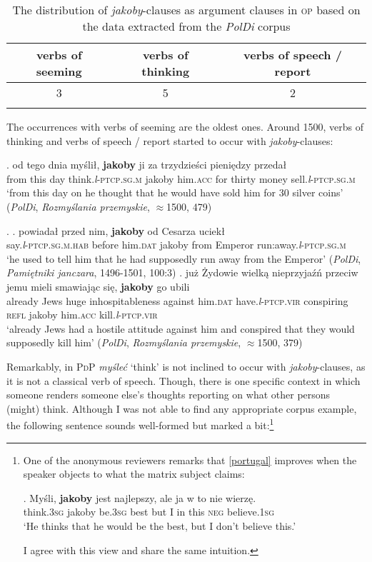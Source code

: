 \documentclass[output=paper
,modfonts
,nonflat]{langsci/langscibook}
\newcommand{\glossformat}[1]{\textsc{#1}}
\newcommand{\firstperson}{\glossformat{1}\xspace}
\newcommand{\thirdperson}{\glossformat{3}\xspace}
\newcommand{\acc}{\glossformat{acc}\xspace}
\newcommand{\dat}{\glossformat{dat}\xspace}
\newcommand{\hab}{\glossformat{hab}\xspace}
\newcommand{\negation}{\glossformat{neg}\xspace}
\newcommand{\lptcp}{\emph{l}\glossformat{-ptcp}\xspace}
\newcommand{\masc}{\glossformat{m}\xspace}
\newcommand{\refl}{\glossformat{refl}\xspace}
\newcommand{\sg}{\glossformat{sg}\xspace}
\newcommand{\vir}{\glossformat{vir}\xspace}
\newcommand{\nquelle}[1]{\newline\phantom{x}\hfill(#1)}
\begin{document}
 \begin{table}[h] \center \begin{tabular}{ccc} 
 \lsptoprule
verbs of seeming & verbs of thinking & verbs of speech / report \\
\midrule
3 & 5 & 2  \\
 \lspbottomrule
\end{tabular}
\caption{The distribution of \emph{jakoby}-clauses as argument clauses in \textsc{op} based on the data extracted from the \emph{PolDi} corpus} \label{staropolski_statystka_argument}
\end{table}

\noindent The occurrences with verbs of seeming are the oldest ones. Around 1500, verbs of thinking and verbs of speech / report started to occur with \emph{jakoby}-clauses:

\exg.		od tego dnia myślił, \textbf{jakoby} ji za trzydzieści pieniędzy przedał \\
		from this day think.{\lptcp}.{\sg}.{\masc} jakoby him.{\acc} for thirty money sell.{\lptcp}.{\sg}.{\masc} \\
		`from this day on he thought that he would have sold him for 30 silver coins' \nquelle{\emph{PolDi}, \emph{Rozmyślania przemyskie}, $\approx$1500, 479}


\ex.	\ag.	powiadał przed nim, \textbf{jakoby} od Cesarza uciekł \\
		say.{\lptcp}.{\sg}.{\masc}.{\hab} before him.{\dat} jakoby from Emperor run:away.{\lptcp}.{\sg}.{\masc} \label{op_1} \\
		`he used to tell him that he had supposedly run away from the Emperor' \nquelle{\emph{PolDi}, \emph{Pamiętniki janczara}, 1496-1501, 100:3} 
	\bg.	  już Żydowie wielką nieprzyjaźń przeciw jemu mieli smawiając się, \textbf{jakoby} go ubili \label{op_2} \\
		already Jews huge inhospitableness against him.{\dat} have.{\lptcp}.{\vir} conspiring {\refl} jakoby him.{\acc} kill.{\lptcp}.{\vir} \\
		`already Jews had a hostile attitude against him and conspired that they would supposedly kill him' \nquelle{\emph{PolDi}, \emph{Rozmyślania przemyskie}, $\approx$1500, 379}        

Remarkably, in \textsc{PdP} \emph{myśleć} `think' is not inclined to occur with \emph{jakoby}-clauses, as it is not a classical verb of speech. Though, there is one specific context in which someone renders someone else's thoughts reporting on what other persons (might) think. Although I was not able to find any appropriate corpus example, the following sentence sounds well-formed but marked a bit:\footnote{One of the anonymous reviewers remarks that \ref{portugal} improves when the speaker objects to what the matrix subject claims:

\exg.		Myśli, \textbf{jakoby} jest najlepszy, ale ja w to nie wierzę. \\
		think.{\thirdperson}{\sg} jakoby be.{\thirdperson}{\sg} best but I in this {\negation} believe.{\firstperson}{\sg} \\
		 `He thinks that he would be the best, but I don't believe this.'

I agree with this view and share the same intuition.
} 
\end{document}
